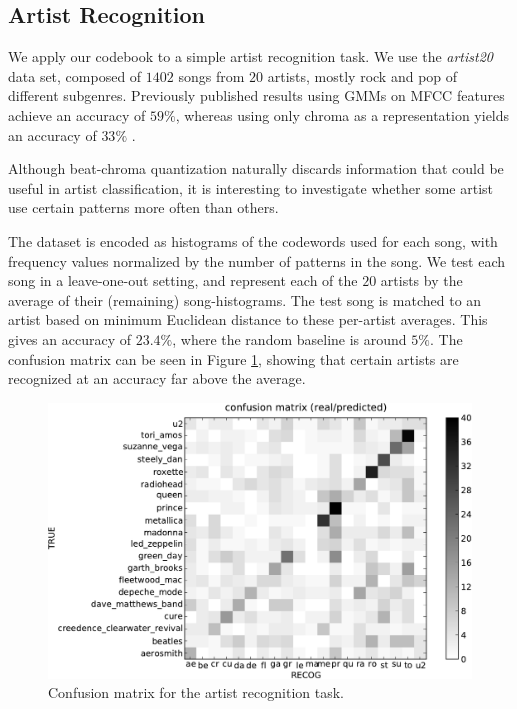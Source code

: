 \documentclass{article}
\begin{document}
\subsection{Artist Recognition} \label{ssec:artist}

We apply our codebook to a simple artist recognition task.
We use the {\it artist20} data set, composed of $1402$ songs from $20$ artists, 
mostly rock and pop of different subgenres.  
Previously published results using GMMs on MFCC features achieve an 
accuracy of $59\%$, whereas using only chroma as a representation yields an
accuracy of $33\%$  \cite{Ellis2007}. 

Although beat-chroma quantization naturally discards information 
that could be useful in artist classification, it is interesting to 
investigate whether some artist use certain patterns more often than others.

The dataset is encoded as histograms of the codewords 
used for each song, with frequency values normalized by the number
of patterns in the song. We test each song in a leave-one-out setting, 
and represent each of the $20$ artists by the average of their (remaining) 
song-histograms.  The test song is matched to an artist based on 
minimum Euclidean distance to these per-artist averages.
This gives an accuracy of $23.4\%$, where the random baseline 
is around $5\%$. 
The confusion matrix can be seen in Figure \ref{fig:conf_mat}, showing 
that certain artists are recognized at an accuracy far above the average.

\begin{figure}[t]
\includegraphics[width=.9\columnwidth]{conf_mat_per_artist}
\caption{\small{Confusion matrix for the artist recognition task.}}
\label{fig:conf_mat}
\end{figure}
\end{document}
